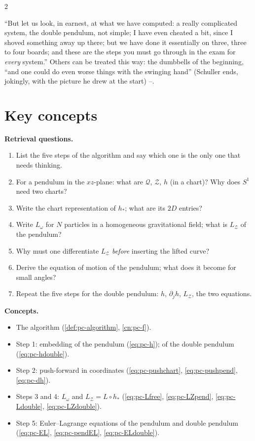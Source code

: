 \begin{paracol}{2}
\begin{coursenote}\label{cn:pc-work}
``But let us look, in earnest, at what we have computed: a really complicated system, the double pendulum, not simple; I have even cheated a bit, since I shoved something away up there; but we have done it essentially on three, three to four boards; and these are the steps you must go through in the exam for \emph{every} system.'' Others can be treated this way: the dumbbells of the beginning, ``and one could do even worse things with the swinging hand'' (Schuller ends, jokingly, with the picture he drew at the start) --.
\end{coursenote}

\section*{Key concepts}
\begin{keyconcepts}
\textbf{Retrieval questions.}
\begin{enumerate}
  \item List the five steps of the algorithm and say which one is the only one that needs thinking.
  \item For a pendulum in the $xz$-plane: what are $\mathcal Q$, $\mathcal Z$, $h$ (in a chart)? Why does $S^1$ need two charts?
  \item Write the chart representation of $h_*$; what are its $2D$ entries?
  \item Write $L_\omega$ for $N$ particles in a homogeneous gravitational field; what is $L_{\mathcal Z}$ of the pendulum?
  \item Why must one differentiate $L_{\mathcal Z}$ \emph{before} inserting the lifted curve?
  \item Derive the equation of motion of the pendulum; what does it become for small angles?
  \item Repeat the five steps for the double pendulum: $h$, $\partial_jh$, $L_{\mathcal Z}$, the two equations.
\end{enumerate}
\textbf{Concepts.}
\begin{itemize}
  \item The algorithm (\cref{def:pc-algorithm}, \cref{cn:pc-f}).
  \item Step 1: embedding of the pendulum (\eqref{eq:pc-h}); of the double pendulum (\eqref{eq:pc-hdouble}).
  \item Step 2: push-forward in coordinates (\eqref{eq:pc-pushchart}, \eqref{eq:pc-pushpend}, \eqref{eq:pc-dh}).
  \item Steps 3 and 4: $L_\omega$ and $L_{\mathcal Z}=L\circ h_*$ (\eqref{eq:pc-Lfree}, \eqref{eq:pc-LZpend}, \eqref{eq:pc-Ldouble}, \eqref{eq:pc-LZdouble}).
  \item Step 5: Euler--Lagrange equations of the pendulum and double pendulum (\eqref{eq:pc-EL}, \eqref{eq:pc-pendEL}, \eqref{eq:pc-ELdouble}).
\end{itemize}
\end{keyconcepts}

\flushside
\end{paracol}
